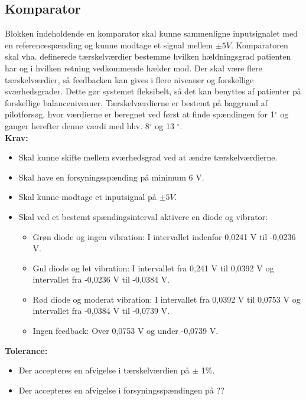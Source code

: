 \subsection{Komparator}\label{KomparatorAfs} 
Blokken indeholdende en komparator skal kunne sammenligne inputsignalet med en referencespænding og kunne modtage et signal mellem $\pm 5 V$. Komparatoren skal vha. definerede tærskelværdier bestemme hvilken hældningsgrad patienten har og i hvilken retning vedkommende hælder mod. Der skal være flere tærskelværdier, så feedbacken kan gives i flere niveauer og forskellige sværhedsgrader. Dette gør systemet fleksibelt, så det kan benyttes af patienter på forskellige balanceniveauer. Tærskelværdierne er bestemt på baggrund af pilotforsøg, hvor værdierne er beregnet ved først at finde spændingen for 1$^{\circ}$ og ganger herefter denne værdi med hhv. 8$^{\circ}$ og 13 $^{\circ}$.\\
\textbf{Krav:}
\begin{itemize}
\item Skal kunne skifte mellem sværhedsgrad ved at ændre tærskelværdierne.
\item Skal have en forsyningsspænding på minimum 6 V.
\item Skal kunne modtage et inputsignal på $\pm 5 V$. 
\item Skal ved et bestemt spændingsinterval aktivere en diode og vibrator:
\begin{itemize}
	\item Grøn diode og ingen vibration: I intervallet indenfor 0,0241 V til -0,0236 V.
	\item Gul diode og let vibration: I intervallet fra 0,241 V til 0,0392 V og intervallet fra -0,0236 V til -0,0384 V.
	\item Rød diode og moderat vibration: I intervallet fra 0,0392 V til 0,0753 V og intervallet fra -0,0384 V til -0,0739 V.
	\item Ingen feedback: Over 0,0753 V og under -0,0739 V. 
\end{itemize} 
\end{itemize}
\textbf{Tolerance:}
\begin{itemize}
\item Der accepteres en afvigelse i tærskelværdien på $\pm$ 1\%.
\item Der accepteres en afvigelse i forsyningsspændingen på ??
\end{itemize}
